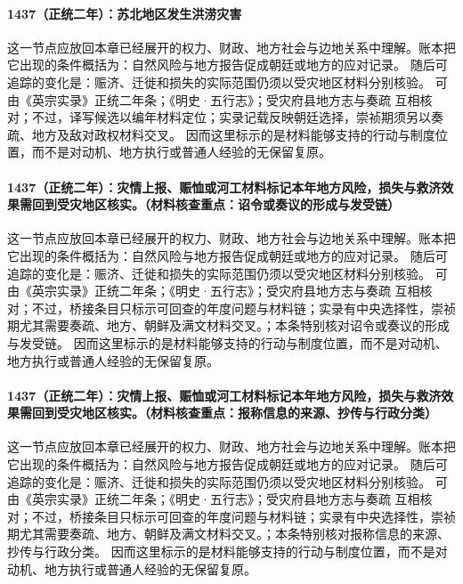 \paragraph{1437（正统二年）：苏北地区发生洪涝灾害} 这一节点应放回本章已经展开的权力、财政、地方社会与边地关系中理解。账本把它出现的条件概括为：自然风险与地方报告促成朝廷或地方的应对记录。 随后可追踪的变化是：赈济、迁徙和损失的实际范围仍须以受灾地区材料分别核验。 可由《英宗实录》正统二年条；《明史·五行志》；受灾府县地方志与奏疏 互相核对；不过，译写候选以编年材料定位；实录记载反映朝廷选择，崇祯期须另以奏疏、地方及敌对政权材料交叉。 因而这里标示的是材料能够支持的行动与制度位置，而不是对动机、地方执行或普通人经验的无保留复原。

\paragraph{1437（正统二年）：灾情上报、赈恤或河工材料标记本年地方风险，损失与救济效果需回到受灾地区核实。（材料核查重点：诏令或奏议的形成与发受链）} 这一节点应放回本章已经展开的权力、财政、地方社会与边地关系中理解。账本把它出现的条件概括为：自然风险与地方报告促成朝廷或地方的应对记录。 随后可追踪的变化是：赈济、迁徙和损失的实际范围仍须以受灾地区材料分别核验。 可由《英宗实录》正统二年条；《明史·五行志》；受灾府县地方志与奏疏 互相核对；不过，桥接条目只标示可回查的年度问题与材料链；实录有中央选择性，崇祯期尤其需要奏疏、地方、朝鲜及满文材料交叉。；本条特别核对诏令或奏议的形成与发受链。 因而这里标示的是材料能够支持的行动与制度位置，而不是对动机、地方执行或普通人经验的无保留复原。

\paragraph{1437（正统二年）：灾情上报、赈恤或河工材料标记本年地方风险，损失与救济效果需回到受灾地区核实。（材料核查重点：报称信息的来源、抄传与行政分类）} 这一节点应放回本章已经展开的权力、财政、地方社会与边地关系中理解。账本把它出现的条件概括为：自然风险与地方报告促成朝廷或地方的应对记录。 随后可追踪的变化是：赈济、迁徙和损失的实际范围仍须以受灾地区材料分别核验。 可由《英宗实录》正统二年条；《明史·五行志》；受灾府县地方志与奏疏 互相核对；不过，桥接条目只标示可回查的年度问题与材料链；实录有中央选择性，崇祯期尤其需要奏疏、地方、朝鲜及满文材料交叉。；本条特别核对报称信息的来源、抄传与行政分类。 因而这里标示的是材料能够支持的行动与制度位置，而不是对动机、地方执行或普通人经验的无保留复原。

